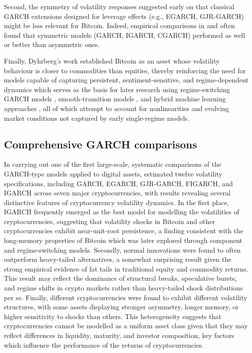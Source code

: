 \documentclass[12pt]{report}
\begin{document}
Second, the symmetry of volatility responses suggested early on that classical GARCH extensions designed for leverage effects (e.g., EGARCH, GJR-GARCH) might be less relevant for Bitcoin. Indeed, empirical comparisons in \cite{chu2017garchcrypto} and \cite{katsiampa2017volatility} often found that symmetric models (GARCH, IGARCH, CGARCH) performed as well or better than asymmetric ones.

Finally, Dyhrberg's work established Bitcoin as an asset whose volatility behaviour is closer to commodities than equities, thereby reinforcing the need for models capable of capturing persistent, sentiment-sensitive, and regime-dependent dynamics which serves as the basis for later research using regime-switching GARCH models \citep{ardia2019regime}, smooth-transition 
models \citep{bencheikh2020stgarch}, and hybrid machine learning approaches 
\citep{zahidetal2022hybridgarch, han2025combinedmethod}, all of which attempt to account for nonlinearities and evolving market conditions not captured by early single-regime models.


\subsection{Comprehensive GARCH comparisons}
In carrying out one of the first large-scale, systematic comparisons of the GARCH-type models applied to digital assets, \cite{chu2017garchcrypto} estimated twelve volatility specifications, including GARCH, EGARCH, GJR-GARCH, FIGARCH, and IGARCH across seven major cryptocurrencies, with results revealing several distinctive features of cryptocurrency volatility dynamics.
In the first place, IGARCH frequently emerged as the best model for modelling the volatilities of cryptocurrencies, suggesting that volatility shocks in Bitcoin and other cryptocurrencies exhibit near-unit-root persistence, a finding consistent with the long-memory properties of Bitcoin which was later explored through component and regime-switching models.
Secondly, normal innovations were found to often outperform heavy-tailed alternatives, a somewhat surprising result given the strong empirical evidence of fat tails in traditional equity and commodity returns. This result may reflect the dominance of structural breaks, speculative bursts, and regime shifts in crypto markets rather than heavy-tailed shock distributions per se.
Finally, different cryptocurrencies were found to exhibit different volatility structures, with some assets displaying stronger asymmetry, longer memory, or higher sensitivity to shocks than others. This heterogeneity suggests that cryptocurrencies cannot be modelled as a uniform asset class given that they may reflect differences in liquidity, maturity, and investor composition, key factors which influence the performance of the returns of cryptocurrencies.
\end{document}
